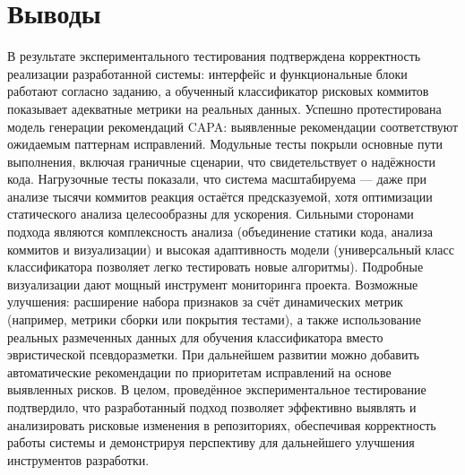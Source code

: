 \section{Выводы}
В результате экспериментального тестирования подтверждена корректность реализации разработанной системы: интерфейс и функциональные блоки работают согласно заданию, а обученный классификатор рисковых коммитов показывает адекватные метрики на реальных данных. Успешно протестирована модель генерации рекомендаций CAPA: выявленные рекомендации соответствуют ожидаемым паттернам исправлений. Модульные тесты покрыли основные пути выполнения, включая граничные сценарии, что свидетельствует о надёжности кода. Нагрузочные тесты показали, что система масштабируема — даже при анализе тысячи коммитов реакция остаётся предсказуемой, хотя оптимизации статического анализа целесообразны для ускорения. Сильными сторонами подхода являются комплексность анализа (объединение статики кода, анализа коммитов и визуализации) и высокая адаптивность модели (универсальный класс классификатора позволяет легко тестировать новые алгоритмы). Подробные визуализации дают мощный инструмент мониторинга проекта. Возможные улучшения: расширение набора признаков за счёт динамических метрик (например, метрики сборки или покрытия тестами), а также использование реальных размеченных данных для обучения классификатора вместо эвристической псевдоразметки. При дальнейшем развитии можно добавить автоматические рекомендации по приоритетам исправлений на основе выявленных рисков. В целом, проведённое экспериментальное тестирование подтвердило, что разработанный подход позволяет эффективно выявлять и анализировать рисковые изменения в репозиториях, обеспечивая корректность работы системы и демонстрируя перспективу для дальнейшего улучшения инструментов разработки.
